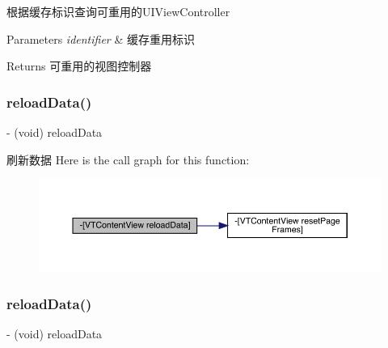 根据缓存标识查询可重用的\+U\+I\+View\+Controller


\begin{DoxyParams}{Parameters}
{\em identifier} & 缓存重用标识\\
\hline
\end{DoxyParams}
\begin{DoxyReturn}{Returns}
可重用的视图控制器 
\end{DoxyReturn}
\mbox{\label{interface_v_t_content_view_a149d0671851947b882cf5f13e11f8964}} 
\subsubsection{\texorpdfstring{reload\+Data()}{reloadData()}\hspace{0.1cm}{\footnotesize\ttfamily [1/3]}}
{\footnotesize\ttfamily -\/ (void) reload\+Data \begin{DoxyParamCaption}{ }\end{DoxyParamCaption}}

刷新数据 Here is the call graph for this function\+:\nopagebreak
\begin{figure}[H]
\begin{center}
\leavevmode
\includegraphics[width=350pt]{interface_v_t_content_view_a149d0671851947b882cf5f13e11f8964_cgraph}
\end{center}
\end{figure}
\mbox{\label{interface_v_t_content_view_a149d0671851947b882cf5f13e11f8964}} 
\subsubsection{\texorpdfstring{reload\+Data()}{reloadData()}\hspace{0.1cm}{\footnotesize\ttfamily [2/3]}}
{\footnotesize\ttfamily -\/ (void) reload\+Data \begin{DoxyParamCaption}{ }\end{DoxyParamCaption}}

